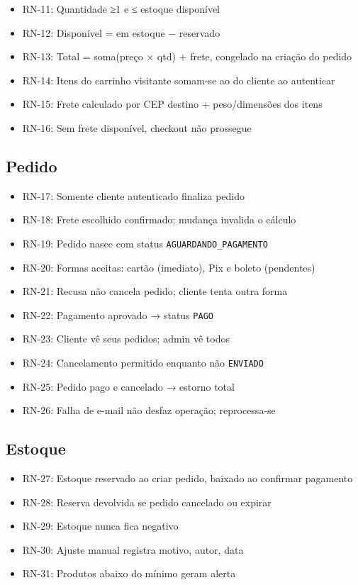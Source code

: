 \documentclass[12pt,a4paper]{article}
\providecommand{\tightlist}{%
  \setlength{\itemsep}{0pt}\setlength{\parskip}{0pt}}
\begin{document}
\begin{itemize}
\tightlist
\item RN-11: Quantidade ≥1 e ≤ estoque disponível
\item RN-12: Disponível = em estoque − reservado
\item RN-13: Total = soma(preço × qtd) + frete, congelado na criação do pedido
\item RN-14: Itens do carrinho visitante somam-se ao do cliente ao autenticar
\item RN-15: Frete calculado por CEP destino + peso/dimensões dos itens
\item RN-16: Sem frete disponível, checkout não prossegue
\end{itemize}

\subsection{Pedido}

\begin{itemize}
\tightlist
\item RN-17: Somente cliente autenticado finaliza pedido
\item RN-18: Frete escolhido confirmado; mudança invalida o cálculo
\item RN-19: Pedido nasce com status \texttt{AGUARDANDO\_PAGAMENTO}
\item RN-20: Formas aceitas: cartão (imediato), Pix e boleto (pendentes)
\item RN-21: Recusa não cancela pedido; cliente tenta outra forma
\item RN-22: Pagamento aprovado → status \texttt{PAGO}
\item RN-23: Cliente vê seus pedidos; admin vê todos
\item RN-24: Cancelamento permitido enquanto não \texttt{ENVIADO}
\item RN-25: Pedido pago e cancelado → estorno total
\item RN-26: Falha de e-mail não desfaz operação; reprocessa-se
\end{itemize}

\subsection{Estoque}

\begin{itemize}
\tightlist
\item RN-27: Estoque reservado ao criar pedido, baixado ao confirmar pagamento
\item RN-28: Reserva devolvida se pedido cancelado ou expirar
\item RN-29: Estoque nunca fica negativo
\item RN-30: Ajuste manual registra motivo, autor, data
\item RN-31: Produtos abaixo do mínimo geram alerta
\end{itemize}
\end{document}
